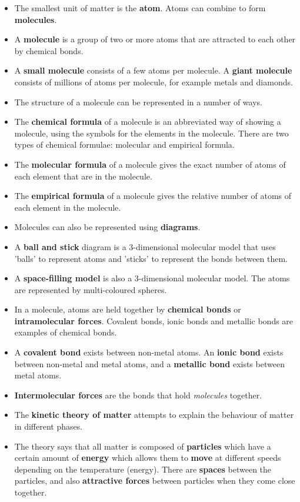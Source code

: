 \begin{itemize}
\item{The smallest unit of matter is the \textbf{atom}. Atoms can combine to form \textbf{molecules}.}
\item{A \textbf{molecule} is a group of two or more atoms that are attracted to each other by chemical bonds.}
\item{A \textbf{small molecule} consists of a few atoms per molecule. A \textbf{giant molecule} consists of millions of atoms per molecule, for example metals and diamonds.}
\item{The structure of a molecule can be represented in a number of ways.}
\item{The \textbf{chemical formula} of a molecule is an abbreviated way of showing a molecule, using the symbols for the elements in the molecule. There are two types of chemical formulae: molecular and empirical formula.}
\item{The \textbf{molecular formula} of a molecule gives the exact number of atoms of each element that are in the molecule.}
\item{The \textbf{empirical formula} of a molecule gives the relative number of atoms of each element in the molecule.}
\item{Molecules can also be represented using \textbf{diagrams}.}
\item{A \textbf{ball and stick} diagram is a 3-dimensional molecular model that uses 'balls' to represent atoms and 'sticks' to represent the bonds between them.}
\item{A \textbf{space-filling model} is also a 3-dimensional molecular model. The atoms are represented by multi-coloured spheres.}
\item{In a molecule, atoms are held together by \textbf{chemical bonds} or \textbf{intramolecular forces}. Covalent bonds, ionic bonds and metallic bonds are examples of chemical bonds.}
\item{A \textbf{covalent bond} exists between non-metal atoms. An \textbf{ionic bond} exists between non-metal and metal atoms, and a \textbf{metallic bond} exists between metal atoms.}
\item{\textbf{Intermolecular forces} are the bonds that hold \textit{molecules} together.}
\item{The \textbf{kinetic theory of matter} attempts to explain the behaviour of matter in different phases.}
\item{The theory says that all matter is composed of \textbf{particles} which have a certain amount of \textbf{energy} which allows them to \textbf{move} at different speeds depending on the temperature (energy). There are \textbf{spaces} between the particles, and also \textbf{attractive forces} between particles when they come close together.}

\end{itemize}
